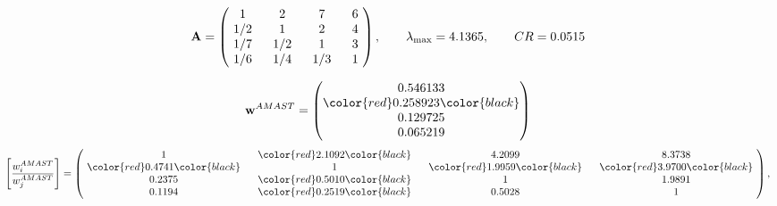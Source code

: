\begin{example}
\begin{equation*}
\mathbf{A} =
\begin{pmatrix}
$\,\,$ 1 $\,\,$ & $\,\,$2$\,\,$ & $\,\,$7$\,\,$ & $\,\,$6 $\,\,$ \\
$\,\,$ 1/2$\,\,$ & $\,\,$ 1 $\,\,$ & $\,\,$2$\,\,$ & $\,\,$4 $\,\,$ \\
$\,\,$ 1/7$\,\,$ & $\,\,$ 1/2$\,\,$ & $\,\,$ 1 $\,\,$ & $\,\,$3 $\,\,$ \\
$\,\,$ 1/6$\,\,$ & $\,\,$ 1/4$\,\,$ & $\,\,$ 1/3$\,\,$ & $\,\,$ 1  $\,\,$ \\
\end{pmatrix},
\qquad
\lambda_{\max} =
4.1365,
\qquad
CR = 0.0515
\end{equation*}

\begin{equation*}
\mathbf{w}^{AMAST} =
\begin{pmatrix}
0.546133\\
\color{red} 0.258923\color{black} \\
0.129725\\
0.065219
\end{pmatrix}\end{equation*}
\begin{equation*}
\left[ \frac{{w}^{AMAST}_i}{{w}^{AMAST}_j} \right] =
\begin{pmatrix}
$\,\,$ 1 $\,\,$ & $\,\,$\color{red} 2.1092\color{black} $\,\,$ & $\,\,$4.2099$\,\,$ & $\,\,$8.3738$\,\,$ \\
$\,\,$\color{red} 0.4741\color{black} $\,\,$ & $\,\,$ 1 $\,\,$ & $\,\,$\color{red} 1.9959\color{black} $\,\,$ & $\,\,$\color{red} 3.9700\color{black}   $\,\,$ \\
$\,\,$0.2375$\,\,$ & $\,\,$\color{red} 0.5010\color{black} $\,\,$ & $\,\,$ 1 $\,\,$ & $\,\,$1.9891 $\,\,$ \\
$\,\,$0.1194$\,\,$ & $\,\,$\color{red} 0.2519\color{black} $\,\,$ & $\,\,$0.5028$\,\,$ & $\,\,$ 1  $\,\,$ \\
\end{pmatrix},
\end{equation*}


\end{example}

